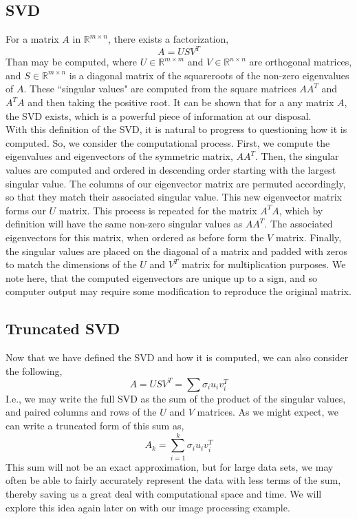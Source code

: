 \documentclass[letterpaper,12pt]{article}
\newcommand{\R}{\mathbb{R}}
\begin{document}
\subsection{SVD}
For a matrix $A$ in $\R^{m\times n}$, there exists a factorization,
\[A=USV^T\]
Than may be computed, where $U\in \R^{m\times m}$ and $V\in \R^{n\times n}$ are orthogonal matrices, and $S\in \R^{m\times n}$ is a diagonal matrix of the squareroots of the non-zero eigenvalues of $A$. These ``singular values" are computed from the square matrices $AA^T$ and $A^TA$ and then taking the positive root. It can be shown that for a any matrix $A$, the SVD exists, which is a powerful piece of information at our disposal.\cite{Extra}\\
With this definition of the SVD, it is natural to progress to questioning how it is computed. So, we consider the computational process. First, we compute the eigenvalues and eigenvectors of the symmetric matrix, $AA^T$. Then, the singular values are computed and ordered in descending order starting with the largest singular value. The columns of our eigenvector matrix are permuted accordingly, so that they match their associated singular value. This new eigenvector matrix forms our $U$ matrix. This process is repeated for the matrix $A^TA$, which by definition will have the same non-zero singular values as $AA^T$. The associated eigenvectors for this matrix, when ordered as before form the $V$ matrix. Finally, the singular values are placed on the diagonal of a matrix and padded with zeros to match the dimensions of the $U$ and $V^T$ matrix for multiplication purposes. We note here, that the computed eigenvectors are unique up to a sign, and so computer output may require some modification to reproduce the original matrix.\cite{SVDHowTo}
\subsection{Truncated SVD}
Now that we have defined the SVD and how it is computed, we can also consider the following,
\[A=USV^T=\sum\sigma_iu_iv^T_i\]
I.e., we may write the full SVD as the sum of the product of the singular values, and paired columns and rows of the $U$ and $V$ matrices. As we might expect, we can write a truncated form of this sum as,
\[A_k = \sum_{i=1}^k\sigma_iu_iv^T_i\]
This sum will not be an exact approximation, but for large data sets, we may often be able to fairly accurately represent the data with less terms of the sum, thereby saving us a great deal with computational space and time. We will explore this idea again later on with our image processing example.\cite{Extra}
\end{document}
